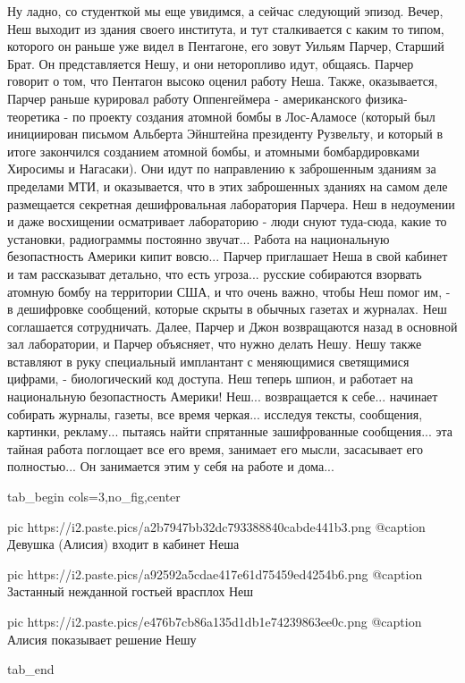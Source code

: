 Ну ладно, со студенткой мы еще увидимся, а сейчас следующий эпизод. Вечер, Неш
выходит из здания своего института, и тут сталкивается с каким то типом,
которого он раньше уже видел в Пентагоне, его зовут Уильям Парчер, Старший
Брат.  Он представляется Нешу, и они неторопливо идут, общаясь. Парчер говорит
о том, что Пентагон высоко оценил работу Неша. Также, оказывается, Парчер
раньше курировал работу Оппенгеймера - американского физика-теоретика - по
проекту создания атомной бомбы в Лос-Аламосе (который был инициирован письмом
Альберта Эйнштейна президенту Рузвельту, и который в итоге закончился созданием
атомной бомбы, и атомными бомбардировками Хиросимы и Нагасаки).  Они идут по
направлению к заброшенным зданиям за пределами МТИ, и оказывается, что в этих
заброшенных зданиях на самом деле размещается секретная дешифровальная
лаборатория Парчера.  Неш в недоумении и даже восхищении осматривает
лабораторию - люди снуют туда-сюда, какие то установки, радиограммы постоянно
звучат... Работа на национальную безопастность Америки кипит вовсю... Парчер
приглашает Неша в свой кабинет и там рассказыват детально, что есть угроза...
русские собираются взорвать атомную бомбу на территории США, и что очень важно,
чтобы Неш помог им, - в дешифровке сообщений, которые скрыты в обычных газетах
и журналах. Неш соглашается сотрудничать. Далее, Парчер и Джон возвращаются
назад в основной зал лаборатории, и Парчер объясняет, что нужно делать Нешу.
Нешу также вставляют в руку специальный имплантант с меняющимися светящимися
цифрами, - биологический код доступа. Неш теперь шпион, и работает на
национальную безопастность Америки! Неш... возвращается к себе... начинает
собирать журналы, газеты, все время черкая... исследуя тексты, сообщения,
картинки, рекламу...  пытаясь найти спрятанные зашифрованные сообщения... эта
тайная работа поглощает все его время, занимает его мысли, засасывает его
полностью... Он занимается этим у себя на работе и дома...


\ifcmt
  tab_begin cols=3,no_fig,center

     pic https://i2.paste.pics/a2b7947bb32dc793388840cabde441b3.png
		 @caption Девушка (Алисия) входит в кабинет Неша

		 pic https://i2.paste.pics/a92592a5cdae417e61d75459ed4254b6.png
		 @caption Застанный нежданной гостьей врасплох Неш

		 pic https://i2.paste.pics/e476b7cb86a135d1db1e74239863ee0c.png
		 @caption Алисия показывает решение Нешу

  tab_end
\fi

